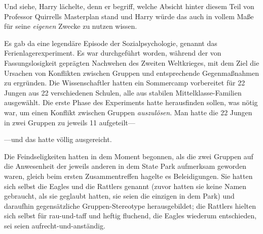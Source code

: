 Und siehe, Harry lächelte, denn er begriff, welche Absicht hinter diesem Teil von Professor Quirrells Masterplan stand und Harry würde das auch in vollem Maße für seine \emph{eigenen} Zwecke zu nutzen wissen.

Es gab da eine legendäre Episode der Sozialpsychologie, genannt das Ferienlagerexperiment. Es war durchgeführt worden, während der von Fassungslosigkeit geprägten Nachwehen des Zweiten Weltkrieges, mit dem Ziel die Ursachen von Konflikten zwischen Gruppen und entsprechende Gegenmaßnahmen zu ergründen. Die Wissenschaftler hatten ein Sommercamp vorbereitet für 22 Jungen aus 22 verschiedenen Schulen, alle aus stabilen Mittelklasse-Familien ausgewählt. Die erste Phase des Experiments hatte herausfinden sollen, was nötig war, um einen Konflikt zwischen Gruppen \emph{auszulösen}. Man hatte die 22 Jungen in zwei Gruppen zu jeweils 11 aufgeteilt—

—und das hatte völlig ausgereicht.

Die Feindseligkeiten hatten in dem Moment begonnen, als die zwei Gruppen auf die Anwesenheit der jeweils anderen in dem State Park aufmerksam geworden waren, gleich beim ersten Zusammentreffen hagelte es Beleidigungen. Sie hatten sich selbst die Eagles und die Rattlers genannt (zuvor hatten sie keine Namen gebraucht, als sie geglaubt hatten, sie seien die einzigen in dem Park) und daraufhin gegensätzliche Gruppen-Stereotype herausgebildet; die Rattlers hielten sich selbst für rau-und-taff und heftig fluchend, die Eagles wiederum entschieden, sei seien aufrecht-und-anständig.

